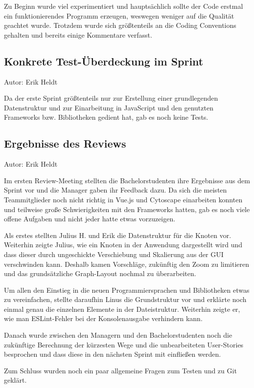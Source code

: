 Zu Beginn wurde viel experimentiert und hauptsächlich sollte der Code erstmal ein funktionierendes Programm erzeugen, weswegen weniger auf die Qualität geachtet wurde. Trotzdem wurde sich größtenteils an die Coding Conventions gehalten und bereits einige Kommentare verfasst.

\subsection{Konkrete Test-Überdeckung im Sprint}
{\small Autor: Erik Heldt}

Da der erste Sprint größtenteils nur zur Erstellung einer grundlegenden Datenstruktur und zur Einarbeitung in JavaScript und den genutzten Frameworks bzw. Bibliotheken gedient hat, gab es noch keine Tests.

\subsection{Ergebnisse des Reviews}
{\small Autor: Erik Heldt}

Im ersten Review-Meeting stellten die Bachelorstudenten ihre Ergebnisse aus dem Sprint vor und die Manager gaben ihr Feedback dazu. Da sich die meisten Teammitglieder noch nicht richtig in Vue.js und Cytoscape einarbeiten konnten und teilweise große Schwierigkeiten mit den Frameworks hatten, gab es noch viele offene Aufgaben und nicht jeder hatte etwas vorzuzeigen.

Als erstes stellten Julius H. und Erik die Datenstruktur für die Knoten vor. Weiterhin zeigte Julius, wie ein Knoten in der Anwendung dargestellt wird und dass dieser durch ungeschickte Verschiebung und Skalierung aus der GUI verschwinden kann. Deshalb kamen Vorschläge, zukünftig den Zoom zu limitieren und das grundsätzliche Graph-Layout nochmal zu überarbeiten.

Um allen den Einstieg in die neuen Programmiersprachen und Bibliotheken etwas zu vereinfachen, stellte daraufhin Linus die Grundstruktur vor und erklärte noch einmal genau die einzelnen Elemente in der Dateistruktur. Weiterhin zeigte er, wie man ESLint-Fehler bei der Konsolenausgabe verhindern kann.

Danach wurde zwischen den Managern und den Bachelorstudenten noch die zukünftige Berechnung der kürzesten Wege und die unbearbeiteten User-Stories besprochen und dass diese in den nächsten Sprint mit einfließen werden.

Zum Schluss wurden noch ein paar allgemeine Fragen zum Testen und zu Git geklärt.

